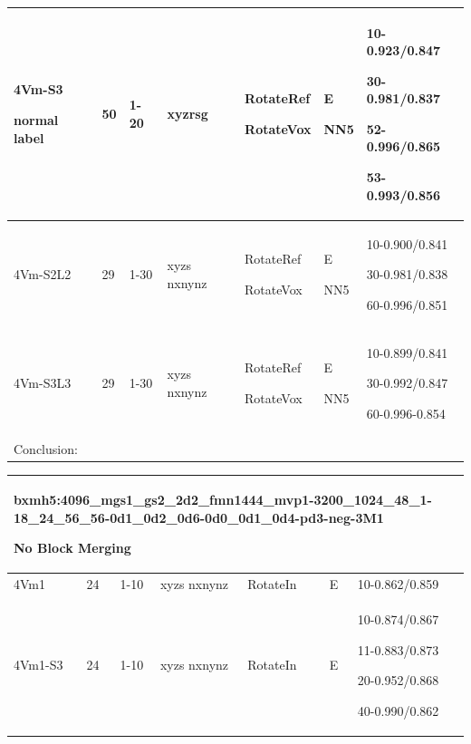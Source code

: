 \documentclass{article}
\begin{document}
\begin{tabular}{|p{1.5cm}|p{1.5cm}|p{1cm}|p{1.5cm}|p{1.5cm}|p{1.5cm}|p{5cm}| }
	\hline
	4Vm-S3\par normal label & 50 & 1-20 & xyzrsg& RotateRef\par RotateVox & E\par NN5 & 10-0.923/0.847\par 30-0.981/0.837\par 52-0.996/0.865\par 53-0.993/0.856\\
	\hline\hline 
	
	4Vm-S2L2 & 29& 1-30 & xyzs nxnynz & RotateRef\par RotateVox & E\par NN5 & 10-0.900/0.841\par 30-0.981/0.838\par 60-0.996/0.851\\
	\hline
	4Vm-S3L3 & 29& 1-30 & xyzs nxnynz & RotateRef\par RotateVox & E\par NN5 & 10-0.899/0.841\par 30-0.992/0.847\par 60-0.996-0.854\\
	\hline
	
	\multicolumn{7}{|p{16cm}|}{ Conclusion:\par	} \\
	\hline 	
\end{tabular}

\noindent
\begin{tabular}{|p{1.5cm}|p{1.5cm}|p{1cm}|p{1.5cm}|p{1.5cm}|p{1.5cm}|p{5cm}| }
	\hline 
	\multicolumn{7}{|p{14cm}|}{bxmh5:4096\_mgs1\_gs2\_2d2\_fmn1444\_mvp1-3200\_1024\_48\_1-18\_24\_56\_56-0d1\_0d2\_0d6-0d0\_0d1\_0d4-pd3-neg-3M1\par No Block Merging }\\
	\hline
	4Vm1 & 24 & 1-10 & xyzs nxnynz & RotateIn & E & 10-0.862/0.859\\
	\hline
	4Vm1-S3 & 24 & 1-10 & xyzs nxnynz & RotateIn & E & 10-0.874/0.867\par 11-0.883/0.873\par 20-0.952/0.868\par 40-0.990/0.862\\
	\hline 
\end{tabular}
\end{document}

